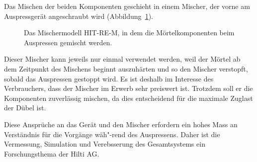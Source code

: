 %
Das Mischen der beiden Komponenten geschieht in einem Mischer, der vorne am Auspressgerät angeschraubt wird (Abbildung~\ref{fig:Mischer}).
%
\begin{figure}
    \centering
    \caption{Das Mischermodell HIT-RE-M, in dem die Mörtelkomponenten beim Auspressen gemischt werden.}
    \label{fig:Mischer}
\end{figure}
%
Dieser Mischer kann jeweils nur einmal verwendet werden, weil der Mörtel ab dem Zeitpunkt des Mischens beginnt auszuhärten und so den Mischer verstopft, sobald das Auspressen gestoppt wird. Es ist deshalb im Interesse des Verbrauchers, dass der Mischer im Erwerb sehr preiswert ist. Trotzdem soll er die Komponenten zuverlässig mischen, da dies entscheidend für die maximale Zuglast der Dübel ist.

Diese Ansprüche an das Gerät und den Mischer erfordern ein hohes Mass an Verständnis für die Vorgänge wäh"-rend des Auspressens. Daher ist die Vermessung, Simulation und Verebsserung des Gesamtsystems ein Forschungsthema der Hilti AG.
%
